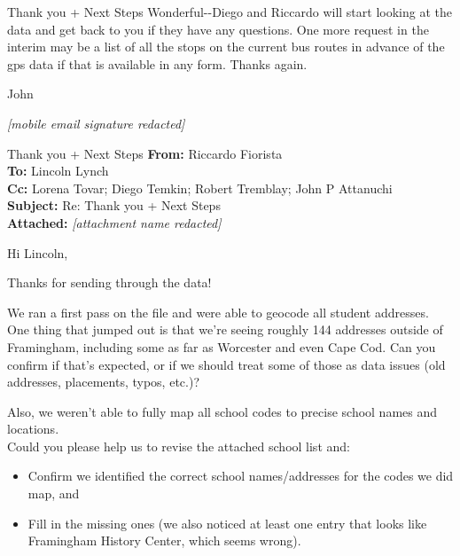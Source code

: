 {\begin{emailbox}{Thank you + Next Steps}
    \vspace{1em}
    Wonderful-\/-Diego and Riccardo will start looking at the data and get back to you if they have any questions. One more request in the interim may be a list of all the stops on the current bus routes in advance of the \acrshort{gps} data if that is available in any form. Thanks again.

    John \vspace{1em}

    \textit{[mobile email signature redacted]}
\end{emailbox}

\begin{emailbox}{Thank you + Next Steps}
    \textbf{From:} Riccardo Fiorista \\
    \textbf{To:} Lincoln Lynch \\
    \textbf{Cc:} Lorena Tovar; Diego Temkin; Robert Tremblay; John P Attanuchi \\
    \textbf{Subject:} Re: Thank you + Next Steps \\
    \textbf{Attached:} \textit{[attachment name redacted]}

    \vspace{1em}
    Hi Lincoln, \vspace{1em}

    Thanks for sending through the data! \vspace{1em}

    We ran a first pass on the file and were able to geocode all student addresses. One thing that jumped out is that we’re seeing roughly 144 addresses outside of Framingham, including some as far as Worcester and even Cape Cod. Can you confirm if that’s expected, or if we should treat some of those as data issues (old addresses, placements, typos, etc.)? \vspace{1em}

    Also, we weren’t able to fully map all school codes to precise school names and locations. \\
    Could you please help us to revise the attached school list and:

    \begin{itemize}
        \item Confirm we identified the correct school names/addresses for the codes we did map, and
        \item Fill in the missing ones (we also noticed at least one entry that looks like Framingham History Center, which seems wrong).
    \end{itemize}


\end{emailbox}}
